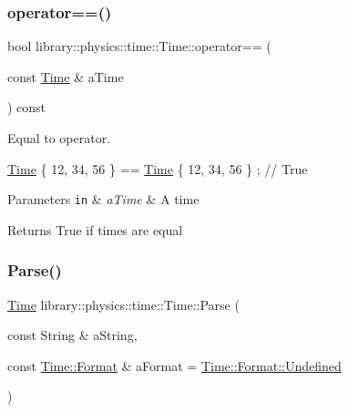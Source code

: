 \subsubsection{\texorpdfstring{operator==()}{operator==()}}
{\footnotesize\ttfamily bool library\+::physics\+::time\+::\+Time\+::operator== (\begin{DoxyParamCaption}\item[{const \hyperlink{classlibrary_1_1physics_1_1time_1_1_time}{Time} \&}]{a\+Time }\end{DoxyParamCaption}) const}



Equal to operator. 


\begin{DoxyCode}
\hyperlink{classlibrary_1_1physics_1_1time_1_1_time_a46a4b9be1451041ae65332f04db21c4b}{Time} \{ 12, 34, 56 \}  == \hyperlink{classlibrary_1_1physics_1_1time_1_1_time_a46a4b9be1451041ae65332f04db21c4b}{Time} \{ 12, 34, 56 \}  ; \textcolor{comment}{// True}
\end{DoxyCode}



\begin{DoxyParams}[1]{Parameters}
\mbox{\tt in}  & {\em a\+Time} & A time \\
\hline
\end{DoxyParams}
\begin{DoxyReturn}{Returns}
True if times are equal 
\end{DoxyReturn}
\mbox{\label{classlibrary_1_1physics_1_1time_1_1_time_a0756ad7ca377adc810b7515411657e3b}} 
\subsubsection{\texorpdfstring{Parse()}{Parse()}}
{\footnotesize\ttfamily \hyperlink{classlibrary_1_1physics_1_1time_1_1_time}{Time} library\+::physics\+::time\+::\+Time\+::\+Parse (\begin{DoxyParamCaption}\item[{const String \&}]{a\+String,  }\item[{const \hyperlink{classlibrary_1_1physics_1_1time_1_1_time_a7cfbcbb1d5d0c536e28e61f1e7cbf1c8}{Time\+::\+Format} \&}]{a\+Format = {\ttfamily \hyperlink{classlibrary_1_1physics_1_1time_1_1_time_a7cfbcbb1d5d0c536e28e61f1e7cbf1c8aec0fc0100c4fc1ce4eea230c3dc10360}{Time\+::\+Format\+::\+Undefined}} }\end{DoxyParamCaption})\hspace{0.3cm}{\ttfamily [static]}}



